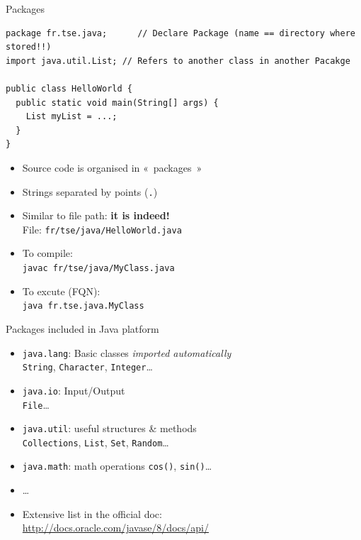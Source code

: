 \documentclass[English,c,%
hyperref={%
    pdftitle={FISA-DE2 OOP in Java},%
    pdfauthor={Muller, Gravier, Laforest, Subercaze},%
    pdfsubject={OOP in Java},%
    pdfkeywords={OOP, Java},%
    colorlinks=true,%
    urlcolor=blue,%
    linkcolor=%
    },%
xcolor={pdftex,svgnames} %
]{beamer}
\begin{document}
\begin{frame}[fragile]{Packages}

\begin{lstlisting}[escapechar=\%,label=hellopackage,caption=HelloWorld.java]
package fr.tse.java;      // Declare Package (name == directory where stored!!)
import java.util.List; // Refers to another class in another Pacakge

public class HelloWorld {
  public static void main(String[] args) {
    List myList = ...;
  }
}
\end{lstlisting}

{\scriptsize
\begin{itemize}
    \item Source code is organised in «~packages~»
    \item Strings separated by points (\texttt{.})
    \item Similar to file path: \textbf{it is indeed!} \\
    File: \texttt{fr/tse/java/HelloWorld.java}
    \medskip
    \item To compile: \\
    \texttt{javac fr/tse/java/MyClass.java}
    \item To excute (FQN): \\
    \texttt{java fr.tse.java.MyClass}
\end{itemize}
}

\end{frame}

\begin{frame}{Packages included in Java platform}

\begin{itemize}
  \item \texttt{java.lang}: Basic classes \hfill \textit{imported automatically}\\
  \texttt{String}, \texttt{Character}, \texttt{Integer}\ldots{}\\
%
  \medskip
  \item \texttt{java.io}: Input/Output\\
  \texttt{File}\ldots{}
%
  \medskip
  \item \texttt{java.util}: useful structures \& methods\\
  \texttt{Collections}, \texttt{List}, \texttt{Set}, \texttt{Random}\ldots{}
%
  \medskip
  \item \texttt{java.math}: math operations
  \texttt{cos()}, \texttt{sin()}\ldots{}
%
  \medskip
  \item \ldots{}
%
  \bigskip
  \item Extensive list in the official doc:\\
  \url{http://docs.oracle.com/javase/8/docs/api/}
\end{itemize}

\end{frame}
\end{document}

